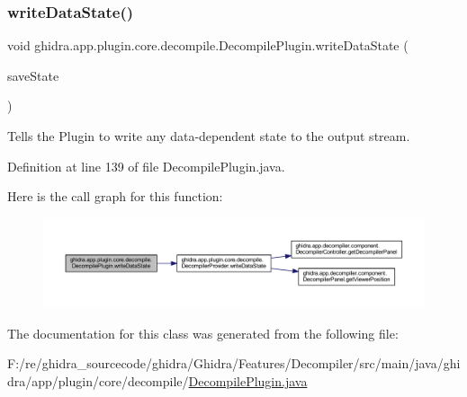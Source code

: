 \subsubsection{\texorpdfstring{writeDataState()}{writeDataState()}}
{\footnotesize\ttfamily void ghidra.\+app.\+plugin.\+core.\+decompile.\+Decompile\+Plugin.\+write\+Data\+State (\begin{DoxyParamCaption}\item[{Save\+State}]{save\+State }\end{DoxyParamCaption})\hspace{0.3cm}{\ttfamily [inline]}}

Tells the Plugin to write any data-\/dependent state to the output stream. 

Definition at line 139 of file Decompile\+Plugin.\+java.

Here is the call graph for this function\+:
\nopagebreak
\begin{figure}[H]
\begin{center}
\leavevmode
\includegraphics[width=350pt]{classghidra_1_1app_1_1plugin_1_1core_1_1decompile_1_1_decompile_plugin_a7f6e36998681226e7abe9ed2debc58a6_cgraph}
\end{center}
\end{figure}


The documentation for this class was generated from the following file\+:\begin{DoxyCompactItemize}
\item 
F\+:/re/ghidra\+\_\+sourcecode/ghidra/\+Ghidra/\+Features/\+Decompiler/src/main/java/ghidra/app/plugin/core/decompile/\mbox{\hyperlink{_decompile_plugin_8java}{Decompile\+Plugin.\+java}}\end{DoxyCompactItemize}
